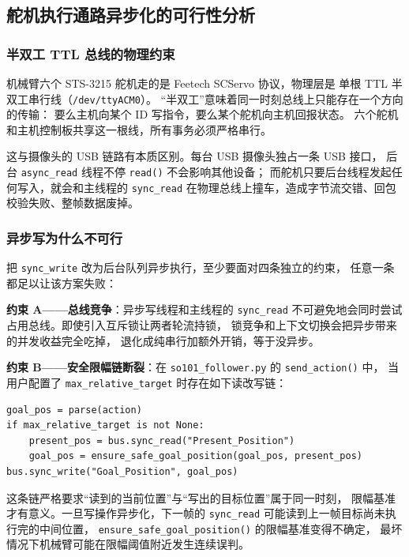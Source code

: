 \subsection{舵机执行通路异步化的可行性分析}\label{sec:async-write}

\subsubsection{半双工 TTL 总线的物理约束}\label{sec:async-write-bus}

机械臂六个 STS-3215 舵机走的是 Feetech SCServo 协议，物理层是
单根 TTL 半双工串行线（\texttt{/dev/ttyACM0}）。
``半双工''意味着同一时刻总线上只能存在一个方向的传输：
要么主机向某个 ID 写指令，要么某个舵机向主机回报状态。
六个舵机和主机控制板共享这一根线，所有事务必须严格串行。

这与摄像头的 USB 链路有本质区别。每台 USB 摄像头独占一条 USB 接口，
后台 \texttt{async\_read} 线程不停 \texttt{read()} 不会影响其他设备；
而舵机只要后台线程发起任何写入，就会和主线程的 \texttt{sync\_read}
在物理总线上撞车，造成字节流交错、回包校验失败、整帧数据废掉。

\subsubsection{异步写为什么不可行}\label{sec:async-write-why-not}

把 \texttt{sync\_write} 改为后台队列异步执行，至少要面对四条独立的约束，
任意一条都足以让该方案失败：

\textbf{约束 A——总线竞争}：异步写线程和主线程的 \texttt{sync\_read}
不可避免地会同时尝试占用总线。即使引入互斥锁让两者轮流持锁，
锁竞争和上下文切换会把异步带来的并发收益完全吃掉，
退化成纯串行加额外开销，等于没异步。

\textbf{约束 B——安全限幅链断裂}：在
\texttt{so101\_follower.py} 的 \texttt{send\_action()} 中，
当用户配置了 \texttt{max\_relative\_target} 时存在如下读改写链：
\begin{verbatim}
goal_pos = parse(action)
if max_relative_target is not None:
    present_pos = bus.sync_read("Present_Position")
    goal_pos = ensure_safe_goal_position(goal_pos, present_pos)
bus.sync_write("Goal_Position", goal_pos)
\end{verbatim}
这条链严格要求``读到的当前位置''与``写出的目标位置''属于同一时刻，
限幅基准才有意义。一旦写操作异步化，下一帧的 \texttt{sync\_read}
可能读到上一帧目标尚未执行完的中间位置，
\texttt{ensure\_safe\_goal\_position()} 的限幅基准变得不确定，
最坏情况下机械臂可能在限幅阈值附近发生连续误判。

